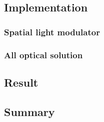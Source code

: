 \subsection{Implementation} %
\subsubsection{Spatial light modulator} %
\subsubsection{All optical solution} %
\subsection{Result}
\subsection{Summary}
